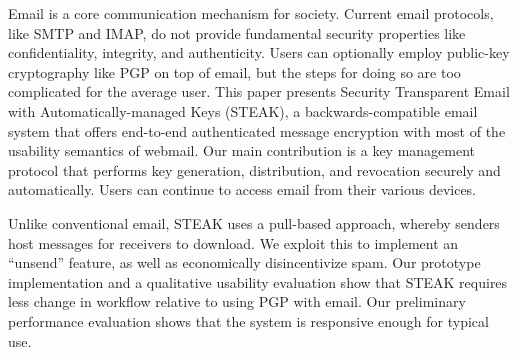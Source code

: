   Email is a core communication mechanism for society.  
Current email protocols, like SMTP and IMAP, do not provide fundamental security 
properties like confidentiality, integrity, and authenticity.  Users can optionally 
employ public-key cryptography like PGP on top of email, but the steps for doing 
so are too complicated for the average user. This paper presents Security Transparent 
Email with Automatically-managed Keys (STEAK), a backwards-compatible email system 
that offers end-to-end authenticated message encryption with most of the usability 
semantics of webmail.  Our main contribution is a key management protocol that 
performs key generation, distribution, and revocation securely and automatically. 
Users can continue to access email from their various devices.

Unlike conventional email, STEAK uses a pull-based approach, whereby senders 
host messages for receivers to download.  We exploit this to implement an “unsend” 
feature, as well as economically disincentivize spam. Our prototype implementation 
and a qualitative usability evaluation show that STEAK requires less change in 
workflow relative to using PGP with email.  Our preliminary performance evaluation 
shows that the system is responsive enough for typical use.
